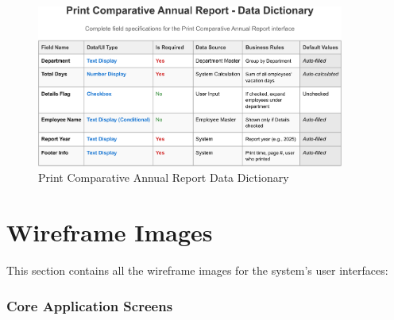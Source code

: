 \documentclass[12pt,a4paper]{article}
\begin{document}
\begin{figure}[H]
\centering
\includegraphics[width=0.9\textwidth]{Data-Dictionary/Screen-Data-Dictionaries/Print-Comparative-Annual-Report-Data-Dictionary/Print-Comparative-Annual-Report-Data-Dictionary-1.png}
\caption{Print Comparative Annual Report Data Dictionary}
\label{fig:print-comparative-annual-data-dict}
\end{figure}

\section{Wireframe Images}
This section contains all the wireframe images for the system's user interfaces:

\subsubsection{Core Application Screens}
\end{document}
